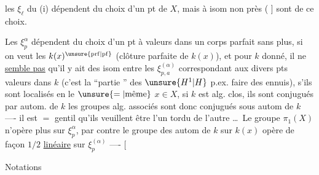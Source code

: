 les $\xi_{\ell}$ du (i) dépendent du choix d'un pt  de $X$, mais à isom non  près (  ]  sont  de ce choix.

Les $\xi_p^\alpha$ dépendent du choix d'un  pt  à valeurs dans un corps parfait sans plus, si on veut les $k(x)^{\unsure{\mathrm{prf}|\mathrm{pf}}}$\deleted{\unsure{,}} (clôture parfaite de $k(x)$), et pour $k$ donné, il ne \uline{semble pas} qu'il y ait  des isom entre les $\xi_{p,a}^{(\alpha)}$ correspondant aux divers pts  valeurs dans $k$ (c'est la ``partie '' des $\unsure{H^1|H}$ p.ex.  faire des ennuis), s'ils sont localisés en le $\unsure{=|\text{même}}$ $x\in X$,   si $k$ est alg. clos, ils sont conjugués par autom. de $k$  les groupes alg. associés sont donc conjugués sous autom de $k$ ---- il est $=$ gentil qu'ils veuillent être l'un tordu de l'autre \ldots\ Le groupe $\pi_1(X)$ n'opère plus sur $\xi_p^\alpha$,
par contre le groupe des autom de $k$ sur $k(x)$ \deleted{\unsure{[ou = de $k$|[ou = de $k$,}}
\deleted{\unsure{il existe]}} opère de façon $1/2$ \uline{linéaire} sur $\xi_p^{(\alpha)}$ ---- [  

Notations
